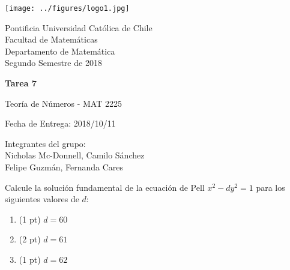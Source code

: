 


\begin{minipage}{2.5cm}
	\texttt{[image: ../figures/logo1.jpg]}
\end{minipage}
\begin{minipage}{13cm}
	\begin{flushleft}
		\raggedright
		{
			\noindent
			{\sc Pontificia Universidad Católica de Chile\\
				Facultad de Matemáticas\\
				Departamento de Matemática} \smallskip \\
			Segundo Semestre de 2018\\
		}
	\end{flushleft}
\end{minipage}

\vspace{2ex}
{\Large \centerline{\bf Tarea 7}}
{\large \centerline{Teoría de Números - MAT 2225}}
\centerline{Fecha de Entrega: 2018/10/11}

\begin{flushright}
	Integrantes del grupo:\\
	Nicholas Mc-Donnell, Camilo Sánchez\\
	Felipe Guzmán, Fernanda Cares
\end{flushright}

\begin{prob}[4 pts]
	Calcule la solución fundamental de la ecuación de Pell $x^2-dy^2=1$ para los siguientes valores de $d$:
	\begin{enumerate}[label = (\roman*)]
		\item (1 pt) $d=60$

		\item (2 pt) $d=61$

		\item (1 pt) $d=62$
	\end{enumerate}
\end{prob}

